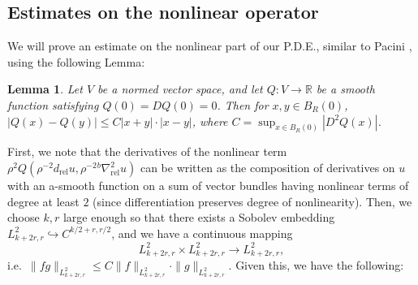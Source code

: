 \documentclass[10pt, a4paper]{article}
\theoremstyle{plain}%
\newtheorem{lem}[theorem]{Lemma}
\theoremstyle{definition}
\numberwithin{figure}{section}
\numberwithin{equation}{section}
\newcommand{\bR}{\mathbb{R}}
\newcommand{\rt}{\rightarrow}
\newcommand{\rel}{\mathrm{rel}}
\begin{document}
\subsection{Estimates on the nonlinear operator}
We will prove an estimate on the nonlinear part of our P.D.E., similar to Pacini \cite{Pac13}, using the following Lemma:
\begin{lem}
	Let $V$ be a normed vector space, and let $Q: V\rt\bR$ be a smooth function satisfying $Q(0)=DQ(0)=0$. Then for $x,y\in B_R(0)$, $|Q(x)-Q(y)|\leq C|x+y|\cdot|x-y|$, where $C=\sup_{x\in B_R(0)}|D^2Q(x)|$.
\end{lem} 
First, we note that the derivatives of the nonlinear term $\rho^2Q(\rho^{-2}{d_\rel u}, \rho^{-2}{^b\nabla_\rel^2u})$ can be written as the composition of derivatives on $u$ with  an a-smooth function on a sum of vector bundles having nonlinear terms of degree at least $2$ (since differentiation preserves degree of nonlinearity). Then, we choose $k,r$ large enough so that there exists a Sobolev embedding $L^2_{k+2r,r}\hookrightarrow C^{k/2+r,r/2}$, and we have a continuous mapping\[
L^2_{k+2r,r}\times L^2_{k+2r,r}\rt L^2_{k+2r,r},
\] 
i.e.\ $\|fg\|_{L^2_{k+2r,r}}\leq C\|f\|_{L^2_{k+2r,r}}\cdot\|g\|_{L^2_{k+2r,r}}$. Given this, we have the following:
\end{document}
